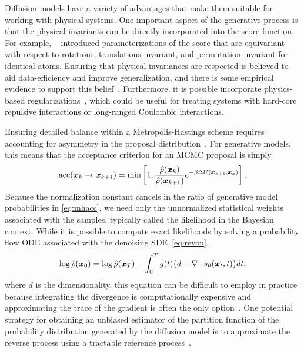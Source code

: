 \documentclass[11pt]{article}
\begin{document}
Diffusion models have a variety of advantages that make them suitable for working with physical systems. 
One important aspect of the generative process is that the physical invariants can be directly incorporated into the score function.
For example, ~\cite{schneuing_structure-based_2022,weiss_guided_2023} introduced parameterizations of the score that are equivariant with respect to rotations, translations invariant, and permutation invariant for identical atoms.
Ensuring that physical invariances are respected is believed to aid data-efficiency and improve generalization, and there is some empirical evidence to support this belief~\cite{sannai_improved_2021}.
Furthermore, it is possible incorporate physics-based regularizations~\cite{zheng_towards_2023}, which could be useful for treating systems with hard-core repulsive interactions or long-ranged Coulombic interactions.

Ensuring detailed balance within a Metropolis-Hastings scheme requires accounting for asymmetry in the proposal distribution~\cite{frenkel_understanding_2002}.
For generative models, this means that the acceptance criterion for an MCMC proposal is simply
\begin{equation}
    \textrm{acc}(\boldsymbol{x}_{k} \to \boldsymbol{x}_{k+1}) = \min \left[ 1, \frac{\hat{\rho}(\boldsymbol{x}_{k})}{\hat{\rho}(\boldsymbol{x}_{k+1})} e^{-\beta \Delta U(\boldsymbol{x}_{k+1},\boldsymbol{x}_k)} \right].
    \label{eq:mhacc}
\end{equation}
Because the normalization constant cancels in the ratio of generative model probabilities in \eqref{eq:mhacc}, we need only the unnormalized statistical weights associated with the samples, typically called the likelihood in the Bayesian context.
While it is possible to compute exact likelihoods by solving a probability flow ODE associated with the denoising SDE~\eqref{eq:revou}, 
\begin{equation}
    \log \hat\rho(\boldsymbol{x}_0) = \log \hat\rho(\boldsymbol{x}_T) - \int_0^T g(t) \bigl( d + \nabla \cdot s_{\theta}(\boldsymbol{x}_t,t) \bigr) dt,
    \label{eq:pfode}
\end{equation}
where $d$ is the dimensionality, this equation can be difficult to employ in practice because integrating the divergence is computationally expensive and approximating the trace of the gradient is often the only option~\cite{grathwohl_ffjord_2018}.
One potential strategy for obtaining an unbiased estimator of the partition function of the probability distribution generated by the diffusion model is to approximate the reverse process using a tractable reference process~\cite{vargas_denoising_2023}.
\end{document}
